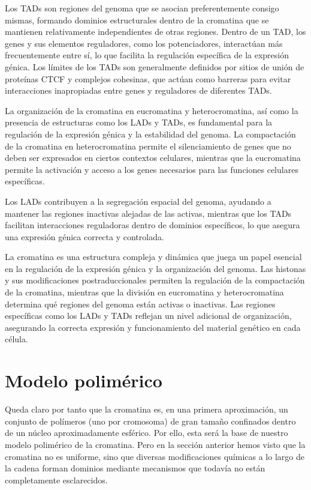 Los TADs son regiones del genoma que se asocian preferentemente consigo mismas, formando dominios estructurales dentro de la cromatina que se mantienen relativamente independientes de otras regiones. Dentro de un TAD, los genes y sus elementos reguladores, como los potenciadores, interactúan más frecuentemente entre sí, lo que facilita la regulación específica de la expresión génica. Los límites de los TADs son generalmente definidos por sitios de unión de proteínas CTCF y complejos cohesinas, que actúan como barreras para evitar interacciones inapropiadas entre genes y reguladores de diferentes TADs.

La organización de la cromatina en eucromatina y heterocromatina, así como la presencia de estructuras como los LADs y TADs, es fundamental para la regulación de la expresión génica y la estabilidad del genoma. La compactación de la cromatina en heterocromatina permite el silenciamiento de genes que no deben ser expresados en ciertos contextos celulares, mientras que la eucromatina permite la activación y acceso a los genes necesarios para las funciones celulares específicas.

Los LADs contribuyen a la segregación espacial del genoma, ayudando a mantener las regiones inactivas alejadas de las activas, mientras que los TADs facilitan interacciones reguladoras dentro de dominios específicos, lo que asegura una expresión génica correcta y controlada.

La cromatina es una estructura compleja y dinámica que juega un papel esencial en la regulación de la expresión génica y la organización del genoma. Las histonas y sus modificaciones postraduccionales permiten la regulación de la compactación de la cromatina, mientras que la división en eucromatina y heterocromatina determina qué regiones del genoma están activas o inactivas. Las regiones específicas como los LADs y TADs reflejan un nivel adicional de organización, asegurando la correcta expresión y funcionamiento del material genético en cada célula.

\section{Modelo polimérico}

Queda claro por tanto que la cromatina es, en una primera aproximación, un conjunto de polímeros (uno por cromosoma) de gran tamaño confinados dentro de un núcleo aproximadamente esférico. Por ello, esta será la base de nuestro modelo polimérico de la cromatina. Pero en la sección anterior hemos visto que la cromatina no es uniforme, sino que diversas modificaciones químicas a lo largo de la cadena forman dominios mediante mecanismos que todavía no están completamente esclarecidos.

